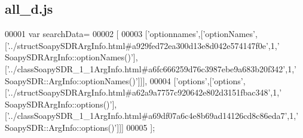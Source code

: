 \subsection{all\+\_\+d.\+js}
\label{all__d_8js_source}

\begin{DoxyCode}
00001 var searchData=
00002 [
00003   [\textcolor{stringliteral}{'optionnames'},[\textcolor{stringliteral}{'optionNames'},[\textcolor{stringliteral}{'../structSoapySDRArgInfo.html#a929fed72ea300d13e8d042e574147f0e'},1,\textcolor{stringliteral}{'
      SoapySDRArgInfo::optionNames()'}],[\textcolor{stringliteral}{'../classSoapySDR\_1\_1ArgInfo.html#a6fc666259d76c3987ebe9a683b20f342'},1,\textcolor{stringliteral}{'
      SoapySDR::ArgInfo::optionNames()'}]]],
00004   [\textcolor{stringliteral}{'options'},[\textcolor{stringliteral}{'options'},[\textcolor{stringliteral}{'../structSoapySDRArgInfo.html#a62a9a7757c920642e802d3151fbac348'},1,\textcolor{stringliteral}{'
      SoapySDRArgInfo::options()'}],[\textcolor{stringliteral}{'../classSoapySDR\_1\_1ArgInfo.html#a69df07a6c4e8b69ad14126cd8c86eda7'},1,\textcolor{stringliteral}{'
      SoapySDR::ArgInfo::options()'}]]]
00005 ];
\end{DoxyCode}
